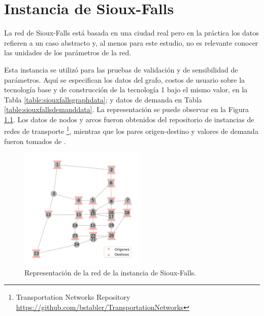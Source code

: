 \chapter{Instancia de Sioux-Falls}
\label{sect:siouxfallsdata}

La red de Sioux-Falls está basada en una ciudad real pero en la práctica los datos refieren a un caso abstracto y, al menos para este estudio, no es relevante conocer las unidades de los parámetros de la red.

Esta instancia se utilizó para las pruebas de validación y de sensibilidad de parámetros. Aquí se especifican los datos del grafo, costos de usuario sobre la tecnología base y de construcción de la tecnología 1 bajo el mismo valor, en la Tabla \ref{table:siouxfallsgraphdata}; y datos de demanda en Tabla \ref{table:siouxfallsdemanddata}. La representación se puede observar en la Figura \ref{fig:siouxfallsapendix}. Los datos de nodos y arcos fueron obtenidos del repositorio de instancias de redes de transporte \footnote{Transportation Networks Repository \url{https://github.com/bstabler/TransportationNetworks}}, mientras que los pares origen-destino y valores de demanda fueron tomados de \textcite{Liu2019}.

\begin{figure}[h!]
\centering
\includegraphics[width=6cm]{../resources/sioux_falls_odpairs.png}
\caption{Representación de la red de la instancia de Sioux-Falls.}
\label{fig:siouxfallsapendix}
\end{figure}

